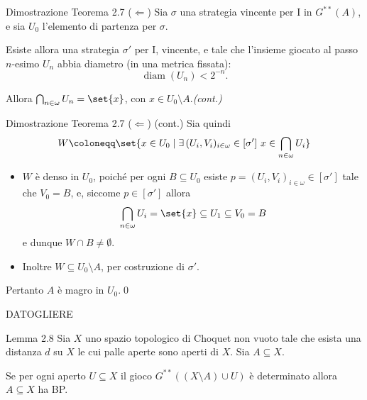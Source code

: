 \documentclass[babel]{beamer}
\renewcommand{\href}[2]{#2}
\begin{document}
\begin{frame}[label={sec:org7e23e96}]{Dimostrazione Teorema 2.7 (\(\Leftarrow\))}
Sia \(\sigma\) una strategia vincente per I in \(G^{**}(A)\), e sia \(U_{0}\) l'elemento di partenza per \(\sigma\).

Esiste allora una strategia \(\sigma'\) per I, vincente, e tale che l'insieme giocato al passo \(n\)-esimo \(U_{n}\) abbia diametro (in una metrica fissata):
\begin{equation*}
\operatorname{diam}(U_{n})<2^{-n}.
\end{equation*}

Allora \(\bigcap_{n \in \omega} U_{n} = \set{x}\), con \(x \in U_{0}\setminus A\).\hfill \textit{(cont.)}
\end{frame}
\begin{frame}[label={sec:orga29e24b}]{Dimostrazione Teorema 2.7 (\(\Leftarrow\)) (cont.)}
Sia quindi
\begin{equation*}
W\coloneqq \set{x \in U_{0}\mid
\exists\, (U_{i}, V_{i})_{i \in \omega} \in [\sigma']\ x \in \bigcap_{n \in \omega} U_{i}}
\end{equation*}
\begin{itemize}
\item \(W\) è denso in \(U_{0}\), poiché per ogni \(B \subseteq U_{0}\) esiste \(p = (U_{i}, V_{i})_{i \in \omega} \in [\sigma']\) tale che \(V_{0} = B\), e, siccome \(p \in [\sigma']\) allora
\begin{equation*}
  \bigcap_{n \in \omega} U_{i} = \set{x} \subseteq U_{1} \subseteq V_{0} = B
\end{equation*}
e dunque \(W\cap B\neq \emptyset\).
\item Inoltre \(W \subseteq U_{0}\setminus A\), per costruzione di \(\sigma'\).
\end{itemize}

Pertanto \(A\) è magro in \(U_{0}\).\qed
\end{frame}
\begin{frame}[label={sec:org6bb6658}]{DATOGLIERE}
\begin{alertblock}{Lemma 2.8}
Sia \(X\) uno \href{../../../../../../../org/roam/20250103145124-topologia.org}{spazio topologico} \href{../../../../../../../org/roam/20250514174255-gioco_di_choquet.org}{di Choquet} non \href{../../../../../../../org/roam/20250131161811-insieme_vuoto_mk.org}{vuoto} tale che esista una \href{../../../../../../../org/roam/20250301193511-spazio_metrico.org}{distanza} \(d\) su \(X\) le cui \href{../../../../../../../org/roam/20250301193511-spazio_metrico.org}{palle aperte} sono aperti di \(X\). Sia \(A \subseteq X\).

Se per ogni aperto \(U \subseteq X\) il \href{../../../../../../../org/roam/20250513111844-gioco_di_banach_mazur.org}{gioco} \(G^{**}\left((X\setminus A)\cup U\right)\) è \href{../../../../../../../org/roam/20250513155732-logic_game.org}{determinato} allora \(A \subseteq X\) ha \href{../../../../../../../org/roam/20250514154039-proprieta_di_baire.org}{BP}.
\end{alertblock}
\end{frame}
\end{document}
